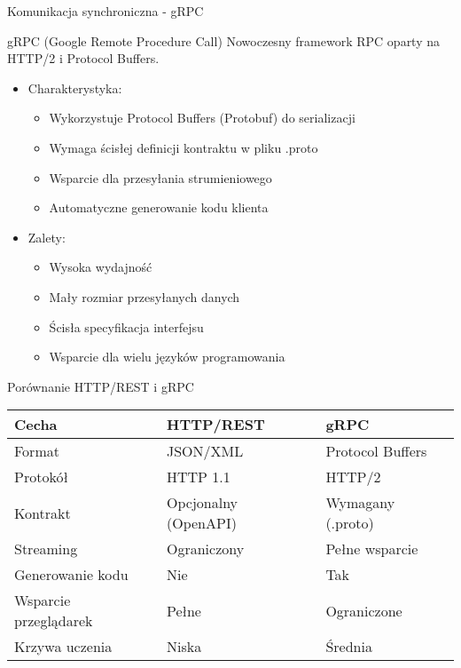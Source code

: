 \documentclass[aspectratio=169]{beamer}
\begin{document}
\begin{frame}{Komunikacja synchroniczna - gRPC}
    \begin{block}{gRPC (Google Remote Procedure Call)}
        Nowoczesny framework RPC oparty na HTTP/2 i Protocol Buffers.
    \end{block}
    
    \begin{itemize}
        \item Charakterystyka:
        \begin{itemize}
            \item Wykorzystuje Protocol Buffers (Protobuf) do serializacji
            \item Wymaga ścisłej definicji kontraktu w pliku .proto
            \item Wsparcie dla przesyłania strumieniowego
            \item Automatyczne generowanie kodu klienta
        \end{itemize}
        \vspace{0.3cm}
        \item Zalety:
        \begin{itemize}
            \item Wysoka wydajność
            \item Mały rozmiar przesyłanych danych
            \item Ścisła specyfikacja interfejsu
            \item Wsparcie dla wielu języków programowania
        \end{itemize}
    \end{itemize}
\end{frame}

\begin{frame}{Porównanie HTTP/REST i gRPC}
    \begin{table}
        \begin{tabular}{l|l|l}
            \toprule
            \textbf{Cecha} & \textbf{HTTP/REST} & \textbf{gRPC} \\
            \midrule
            Format & JSON/XML & Protocol Buffers \\
            Protokół & HTTP 1.1 & HTTP/2 \\
            Kontrakt & Opcjonalny (OpenAPI) & Wymagany (.proto) \\
            Streaming & Ograniczony & Pełne wsparcie \\
            Generowanie kodu & Nie & Tak \\
            Wsparcie przeglądarek & Pełne & Ograniczone \\
            Krzywa uczenia & Niska & Średnia \\
            \bottomrule
        \end{tabular}
    \end{table}
\end{frame}
\end{document}
